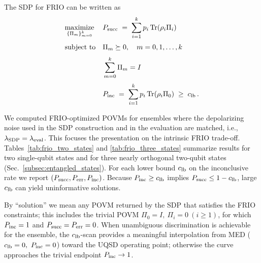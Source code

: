 The SDP for FRIO can be written as
\begin{align}
     & \underset{\{\Pi_m\}_{m=0}^{k}}{\text{maximize}}
     &                                                 & P_{\mathrm{succ}} \;=\; \sum_{i=1}^{k} p_{i}\,\mathrm{Tr}(\rho_{i}\Pi_{i})                                                                                    \\[0.25em]
     & \text{subject to}
     &                                                 & \Pi_{m} \succeq 0,\quad m=0,1,\ldots,k                                                                                                             \\[0.25em]
     &                                                 &                                                                 & \sum_{m=0}^{k} \Pi_{m} = I                                                       \\[0.25em]
     &                                                 &                                                                 & P_{\mathrm{inc}} \;=\; \sum_{i=1}^{k} p_{i}\,\mathrm{Tr}(\rho_{i}\Pi_{0}) \;\ge\; c_{\mathrm{lb}} \, .
\end{align}

We computed FRIO-optimized POVMs for ensembles where the depolarizing noise used
in the SDP construction and in the evaluation are matched, i.e., \(\lambda_{\mathrm{SDP}}=\lambda_{\mathrm{eval}}\).
This focuses the presentation on the intrinsic FRIO trade-off. Tables~\ref{tab:frio_two_states}
and \ref{tab:frio_three_states} summarize results for two single-qubit states and
for three nearly orthogonal two-qubit states (Sec.~\ref{subsec:entangled_states}).
For each lower bound \(c_{\mathrm{lb}}\) on the inconclusive rate we report
\((P_{\mathrm{succ}},P_{\mathrm{err}},P_{\mathrm{inc}})\). Because \(P_{\mathrm{inc}}\ge c_{\mathrm{lb}}\) implies \(P_{\mathrm{succ}} \le 1-c_{\mathrm{lb}}\),
large \(c_{\mathrm{lb}}\) can yield uninformative solutions.

By “solution” we mean any POVM returned by the SDP that satisfies the FRIO
constraints; this includes the trivial POVM \(\Pi_{0}=I,\ \Pi_{i}=0\ (i\ge1)\),
for which \(P_{\mathrm{inc}}=1\) and \(P_{\mathrm{succ}}=P_{\mathrm{err}}=0\). When unambiguous discrimination is
achievable for the ensemble, the \(c_{\mathrm{lb}}\)-scan provides a meaningful interpolation
from MED (\(\clb=0,\ \pinc=0\)) toward the UQSD operating point; otherwise the
curve approaches the trivial endpoint \(P_{\mathrm{inc}}\to 1\).

